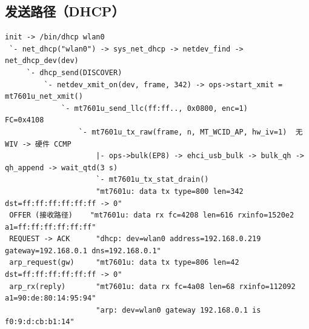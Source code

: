 \subsection{发送路径（DHCP）}
\begin{lstlisting}
init -> /bin/dhcp wlan0
 `- net_dhcp("wlan0") -> sys_net_dhcp -> netdev_find -> net_dhcp_dev(dev)
     `- dhcp_send(DISCOVER)
         `- netdev_xmit_on(dev, frame, 342) -> ops->start_xmit = mt7601u_net_xmit()
             `- mt7601u_send_llc(ff:ff.., 0x0800, enc=1)        FC=0x4108
                 `- mt7601u_tx_raw(frame, n, MT_WCID_AP, hw_iv=1)  无 WIV -> 硬件 CCMP
                     |- ops->bulk(EP8) -> ehci_usb_bulk -> bulk_qh -> qh_append -> wait_qtd(3 s)
                     `- mt7601u_tx_stat_drain()
                     "mt7601u: data tx type=800 len=342 dst=ff:ff:ff:ff:ff:ff -> 0"
 OFFER (接收路径)    "mt7601u: data rx fc=4208 len=616 rxinfo=1520e2 a1=ff:ff:ff:ff:ff:ff"
 REQUEST -> ACK      "dhcp: dev=wlan0 address=192.168.0.219 gateway=192.168.0.1 dns=192.168.0.1"
 arp_request(gw)     "mt7601u: data tx type=806 len=42 dst=ff:ff:ff:ff:ff:ff -> 0"
 arp_rx(reply)       "mt7601u: data rx fc=4a08 len=68 rxinfo=112092 a1=90:de:80:14:95:94"
                     "arp: dev=wlan0 gateway 192.168.0.1 is f0:9:d:cb:b1:14"
\end{lstlisting}

